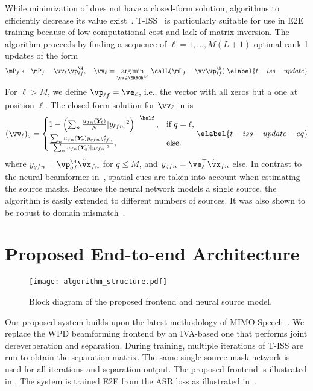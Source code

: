 \documentclass[a4paper]{article}
\begin{document}
While minimization of  does not have a closed-form solution, algorithms to efficiently decrease its value exist~\cite{ilrma-t,nakashimaJointDereverberationSeparation2021}.
T-ISS~\cite{nakashimaJointDereverberationSeparation2021} is particularly suitable for use in E2E training because of low computational cost and lack of matrix inversion.
The algorithm proceeds by finding a sequence of $\ell = 1,\ldots, M(L+1)$ optimal rank-1 updates of the form
\begin{align}
  \mP_f \gets \mP_f - \vv_\ell \vp_{\ell f}^\H, \quad \vv_\ell = \underset{\vv \in \C^M}{\arg\min}\ \calL(\mP_f - \vv \vp_{\ell f}^\H).
  \elabel{t-iss-update}
\end{align}
For $\ell > M$, we define $\vp_{\ell f} = \ve_\ell$, i.e., the vector with all zeros but a one at position $\ell$.
The closed form solution for $\vv_\ell$ in  is
\begin{align}
    (\vv_{\ell})_q = 
    \begin{cases}
      1 - \left(\sum_{n} \frac{u_{fn}(\bm{Y}_\ell)}{N}|y_{\ell fn}|^2  \right)^{-\half}, & \text{if $q = \ell$,} \smallskip \\
      \frac{\sum_{n} u_{fn}(\bm{Y}_q) y_{qfn}y^{*}_{\ell f n}}{\sum_{n} u_{f n}(\bm{Y}_q) |y_{\ell f n}|^2 }, & \text{else}.
    \end{cases}
  \elabel{t-iss-update-eq}
\end{align}
where $y_{qfn} = \vp_{qf}^\H \tilde{\vx}_{fn}$ for $q \leq M$, and $y_{qfn} = \ve_\ell^\top \tilde{\vx}_{fn}$ else.
In contrast to the neural beamformer in~\cite{zhangEndtoEndFarFieldSpeech2020,zhangEndtoEndDereverberationBeamforming2021}, spatial cues are taken into account when estimating the source masks.
Because the neural network models a single source, the algorithm is easily extended to different numbers of sources.
It was also shown to be robust to domain mismatch~\cite{saijo_tiss_2021}.

\section{Proposed End-to-end Architecture}

\begin{figure}
  \centering
  \texttt{[image: algorithm\_structure.pdf]}
  \caption{Block diagram of the proposed frontend and neural source model.}
\end{figure}

Our proposed system builds upon the latest methodology of MIMO-Speech~\cite{zhangEndtoEndDereverberationBeamforming2021}.
We replace the WPD beamforming frontend by an IVA-based one that performs joint dereverberation and separation.
During training, multiple iterations of T-ISS are run to obtain the separation matrix.
The same single source mask network is used for all iterations and separation output.
The proposed frontend is illustrated in .
The system is trained E2E from the ASR loss as illustrated in~.
\end{document}
